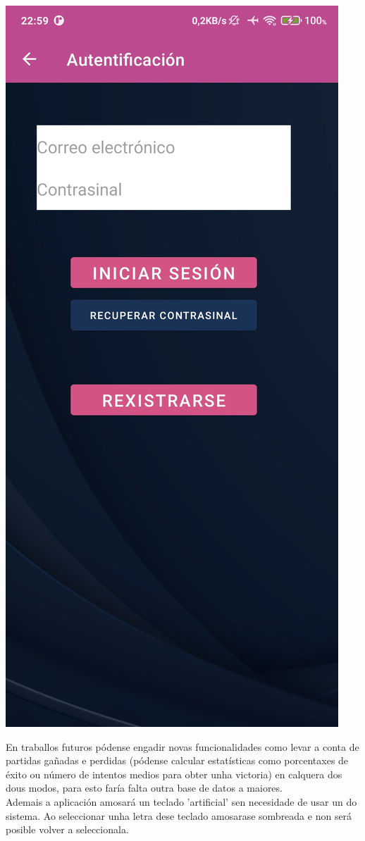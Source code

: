\begin{center}
\includegraphics[scale=0.15]{imaxes/auth.jpg}\\ [30 pt]
\end{center}
En traballos futuros pódense engadir novas funcionalidades como levar a conta de partidas gañadas e perdidas (pódense calcular estatísticas como porcentaxes de éxito ou número de intentos medios para obter unha victoria) en calquera dos dous modos, para esto faría falta outra base de datos a maiores.\\

Ademais a aplicación amosará un teclado 'artificial' sen necesidade de usar un do sistema. Ao seleccionar unha letra dese teclado amosarase sombreada e non será posible volver a seleccionala.
 \let\cleardoublepage=\clearpage 